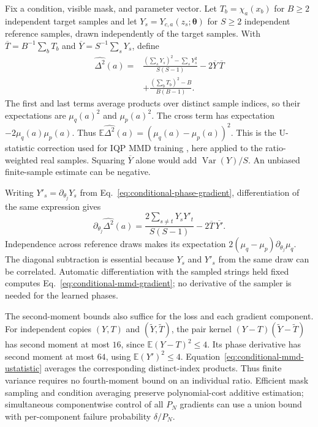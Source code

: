 \documentclass[pra,aps,10pt,twocolumn,floatfix,superscriptaddress,
notitlepage,longbibliography]{revtex4-2}
\newcommand{\E}{\mathbb{E}}
\begin{document}
Fix a condition, visible mask, and parameter vector. Let $T_b=\chi_a(x_b)$ for $B\geq2$ independent target samples and let $Y_s=Y_{c,a}(z_s;\boldsymbol\theta)$ for $S\geq2$ independent reference samples, drawn independently of the target samples. With $\overline T=B^{-1}\sum_b T_b$ and $\overline Y=S^{-1}\sum_sY_s$, define
\begin{equation}
\begin{aligned}
    \widehat{\Delta^2}(a)
    ={}&\frac{(\sum_sY_s)^2-\sum_sY_s^2}{S(S-1)}
       -2\overline Y\,\overline T\\
       &+\frac{(\sum_bT_b)^2-B}{B(B-1)}.
\end{aligned}
\label{eq:conditional-mmd-ustatistic}
\end{equation}
The first and last terms average products over distinct sample indices, so their expectations are $\mu_q(a)^2$ and $\mu_p(a)^2$. The cross term has expectation $-2\mu_q(a)\mu_p(a)$. Thus $\E\widehat{\Delta^2}(a)=(\mu_q(a)-\mu_p(a))^2$. This is the U-statistic correction used for IQP MMD training \cite{recio-armengolTrainClassicalDeploy2026}, here applied to the ratio-weighted real samples. Squaring $\overline Y$ alone would add $\operatorname{Var}(Y)/S$. An unbiased finite-sample estimate can be negative.

Writing $Y'_s=\partial_{\theta_j}Y_s$ from Eq.~\eqref{eq:conditional-phase-gradient}, differentiation of the same expression gives
\begin{equation}
    \partial_{\theta_j}\widehat{\Delta^2}(a)
    =\frac{2\sum_{s\ne t}Y_sY'_t}{S(S-1)}
       -2\overline T\,\overline{Y'}.
\label{eq:conditional-mmd-gradient}
\end{equation}
Independence across reference draws makes its expectation $2(\mu_q-\mu_p)\partial_{\theta_j}\mu_q$. The diagonal subtraction is essential because $Y_s$ and $Y'_s$ from the same draw can be correlated. Automatic differentiation with the sampled strings held fixed computes Eq.~\eqref{eq:conditional-mmd-gradient}; no derivative of the sampler is needed for the learned phases.

The second-moment bounds also suffice for the loss and each gradient component. For independent copies $(Y,T)$ and $(\widetilde Y,\widetilde T)$, the pair kernel $(Y-T)(\widetilde Y-\widetilde T)$ has second moment at most $16$, since $\E(Y-T)^2\leq4$. Its phase derivative has second moment at most $64$, using $\E(Y')^2\leq4$. Equation~\eqref{eq:conditional-mmd-ustatistic} averages the corresponding distinct-index products. Thus finite variance requires no fourth-moment bound on an individual ratio. Efficient mask sampling and condition averaging preserve polynomial-cost additive estimation; simultaneous componentwise control of all $P_N$ gradients can use a union bound with per-component failure probability $\delta/P_N$.
\end{document}

